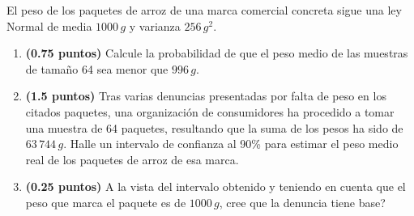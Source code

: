 
El peso de los paquetes de arroz de una marca comercial concreta sigue
una ley Normal de media $1000\,g$ y varianza $256\,g^2$.
\begin{enumerate}[label=\alph*)]
  \item \textbf{(0.75 puntos)} Calcule la probabilidad de que el peso medio
  de las muestras de tamaño 64 sea menor que $996\,g$.
  \item \textbf{(1.5 puntos)} Tras varias denuncias presentadas por falta de
  peso en los citados paquetes, una organización de consumidores ha procedido
  a tomar una muestra de 64 paquetes, resultando que la suma de los pesos ha
  sido de $63\,744\,g$. Halle un intervalo de confianza al 90\% para estimar
  el peso medio real de los paquetes de arroz de esa marca.
  \item \textbf{(0.25 puntos)} A la vista del intervalo obtenido y teniendo
  en cuenta que el peso que marca el paquete es de $1000\,g$,
  \textquestiondown{}cree que la denuncia tiene base?
\end{enumerate}
